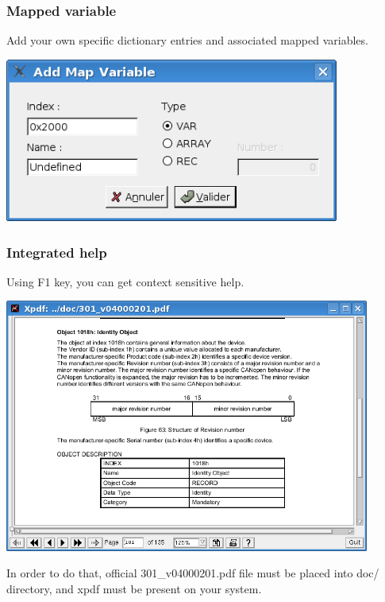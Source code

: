\documentclass[12pt,english,a4paper]{book}
\begin{document}
\subsubsection{Mapped variable}

Add your own specific dictionary entries and associated mapped variables.

\begin{center}
\includegraphics[width=11cm]{Pictures/10000201000001C4000000DD129D4661} 
\par\end{center}


\subsubsection{Integrated help}

Using F1 key, you can get context sensitive help.

\begin{center}
\includegraphics[width=12cm]{Pictures/10000201000002F30000020B23ED7F67} 
\par\end{center}

In order to do that, official 301\_v04000201.pdf file must be placed
into doc/ directory, and xpdf must be present on your system.
\end{document}

